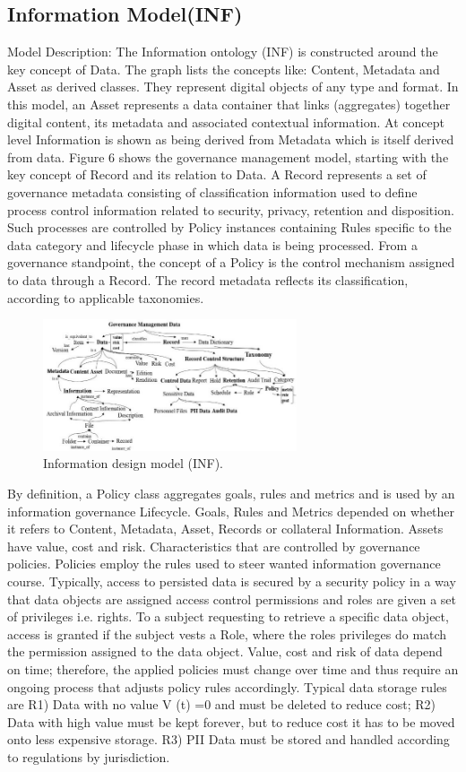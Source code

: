 \documentclass[a4paper,twoside]{article}
\begin{document}
\subsection{Information Model(INF)}
Model Description: The Information ontology (INF) is constructed around the key concept of Data. The graph lists the concepts like: Content, Metadata and Asset as derived classes. They represent digital objects of any type and format. In this model, an Asset represents a data container that links (aggregates) together digital content, its metadata and associated contextual information. At concept level Information is shown as being derived from Metadata which is itself derived from data. Figure 6 shows the governance management model, starting with the key concept of Record and its relation to Data. A Record represents a set of governance metadata consisting of classification information used to define process control information related to security, privacy, retention and disposition. Such processes are controlled by Policy instances containing Rules specific to the data category and lifecycle phase in which data is being processed. 
From a governance standpoint, the concept of a Policy is the control mechanism assigned to data through a Record. The record metadata reflects its classification, according to applicable taxonomies.
%
\begin{figure}[ht]
  \centering
    \includegraphics[width=7.5cm]{images/Fig6-IG.Inf.Model.png}
    \caption{Information design model (INF).}
  \label{fig:infmod}
\end{figure}
By definition, a Policy class aggregates goals, rules and metrics and is used by an information governance Lifecycle. Goals, Rules and Metrics depended on whether it refers to Content, Metadata, Asset, Records or collateral Information. Assets have value, cost and risk. Characteristics that are controlled by governance policies. Policies employ the rules used to steer wanted information governance course. Typically, access to persisted data is secured by a security policy in a way that data objects are assigned access control permissions and roles are given a set of privileges i.e. rights. To a subject requesting to retrieve a specific data object, access is granted if the subject vests a Role, where the roles privileges do match the permission assigned to the data object. 
Value, cost and risk of data depend on time; therefore, the applied policies must change over time and thus require an ongoing process that adjusts policy rules accordingly. Typical data storage rules are R1) Data with no value V (t) =0 and must be deleted to reduce cost; R2) Data with high value must be kept forever, but to reduce cost it has to be moved onto less expensive storage. R3) PII Data must be stored and handled according to regulations by jurisdiction. 
%
\end{document}
